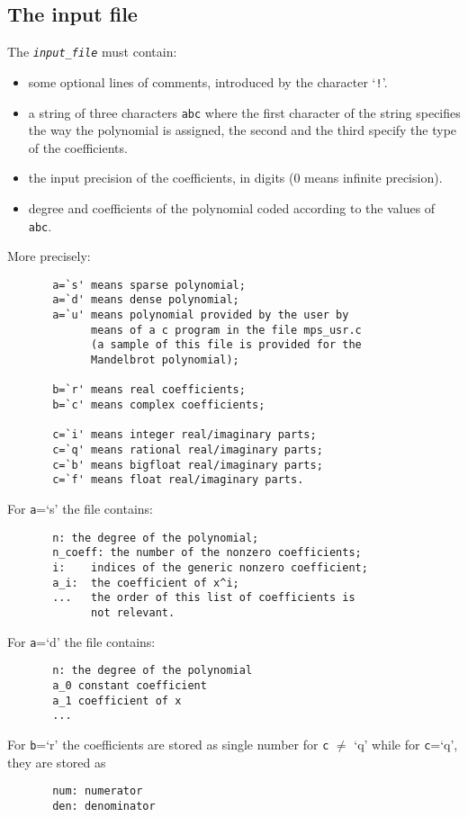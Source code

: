 \documentclass{article}
\begin{document}
\subsection*{The input file}
The {\tt \em input\_file} must  contain:
\begin{itemize}
\item some optional lines of comments, introduced by the character `{\tt !}'.
\item a string of three characters {\tt abc} where the first character
of the string specifies the way the polynomial is assigned, the second
and the third specify the type of the coefficients.
\item the input precision of the coefficients, in digits (0 means
infinite precision).
\item degree and coefficients of the polynomial coded according to the
  values of {\tt abc}.
\end{itemize}

\noindent
More precisely:
\begin{verbatim}
       a=`s' means sparse polynomial; 
       a=`d' means dense polynomial;
       a=`u' means polynomial provided by the user by 
             means of a c program in the file mps_usr.c 
             (a sample of this file is provided for the 
             Mandelbrot polynomial);

       b=`r' means real coefficients; 
       b=`c' means complex coefficients;
    
       c=`i' means integer real/imaginary parts;
       c=`q' means rational real/imaginary parts;
       c=`b' means bigfloat real/imaginary parts;
       c=`f' means float real/imaginary parts.
\end{verbatim}

\noindent
For {\tt a}=`s' the file contains:
\begin{verbatim}
       n: the degree of the polynomial;
       n_coeff: the number of the nonzero coefficients;
       i:    indices of the generic nonzero coefficient;
       a_i:  the coefficient of x^i;
       ...   the order of this list of coefficients is 
             not relevant.
\end{verbatim}

\noindent
For {\tt a}=`d' the file contains:
\begin{verbatim}
       n: the degree of the polynomial
       a_0 constant coefficient 
       a_1 coefficient of x
       ...
\end{verbatim}

\noindent
For {\tt b}=`r' the coefficients are stored as single number for
{\tt c} $\neq$ `q' while for {\tt c}=`q', they are stored as
\begin{verbatim}
       num: numerator
       den: denominator
\end{verbatim}
\end{document}
